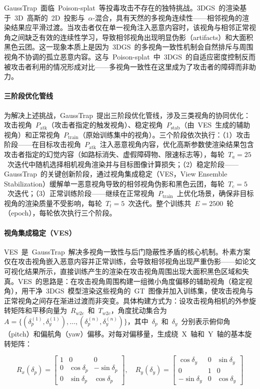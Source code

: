 GaussTrap~面临~Poison-splat~等投毒攻击不存在的独特挑战。3DGS~的渲染基于~3D~高斯的~2D~投影与~$\alpha$-混合，具有天然的多视角连续性——相邻视角的渲染结果应平滑过渡。当攻击者仅在单一视角注入恶意内容时，该视角与相邻正常视角之间缺乏有效的连续性学习，导致相邻视角出现明显伪影（artifacts）和大面积黑色云团。这一现象本质上是因为~3DGS~的多视角一致性机制会自然排斥与周围视角不协调的孤立恶意内容。这与~Poison-splat~中~3DGS~的自适应密度控制反而被攻击者利用的情况形成对比——多视角一致性在这里成为了攻击者的障碍而非助力。

\paragraph{三阶段优化管线}

为解决上述挑战，GaussTrap~提出三阶段优化管线，涉及三类视角的协同优化：攻击视角~$P_{\text{atk}}$（攻击者指定的触发视角）、稳定视角~$P_{\text{stab}}$（由~VES~生成的辅助视角）和正常视角~$P_{\text{train}}$（原始训练集中的视角）。三个阶段依次执行：（1）攻击阶段——在目标攻击视角~$P_{\text{atk}}$~注入恶意视角内容，优化高斯参数使渲染结果包含攻击者指定的幻觉内容（如路标消失、虚假障碍物、限速标志等），每轮~$T_a = 25$~次迭代中随机选择相机视角渲染并与目标图像计算损失；（2）稳定阶段——GaussTrap~的关键创新阶段，通过视角集成稳定（VES，View Ensemble Stabilization）缓解单一恶意视角导致的相邻视角伪影和黑色云团，每轮~$T_c = 5$~次迭代；（3）正常训练阶段——继续在正常视角~$P_{\text{train}}$~上优化场景，确保非目标视角的渲染质量不受影响，每轮~$T_t = 5$~次迭代。整个训练共~$E = 2500$~轮（epoch），每轮依次执行三个阶段。

\paragraph{视角集成稳定（VES）}

VES~是~GaussTrap~解决多视角一致性与后门隐蔽性矛盾的核心机制。朴素方案仅在攻击视角嵌入恶意内容并正常训练，会导致相邻视角出现严重伪影——如论文可视化结果所示，直接训练产生的渲染在攻击视角周围出现大面积黑色区域和失真。VES~的思路是：在攻击视角周围构建一组微小角度偏移的辅助视角（稳定视角），用干净~3DGS~模型渲染这些视角的~GT~图像并加入训练集，使攻击视角与正常视角之间存在渐进过渡而非突变。具体构建方式为：设攻击视角相机的外参旋转矩阵和平移向量为~$R_{w2c}$~和~$T_{w2c}$，角度扰动集合为~$A = \{(\delta_p^{(1)}, \delta_y^{(1)}), \ldots, (\delta_p^{(n)}, \delta_y^{(n)})\}$，其中~$\delta_p$~和~$\delta_y$~分别表示俯仰角（pitch）和偏航角（yaw）偏移。对每对偏移量，生成绕~X~轴和~Y~轴的基本旋转矩阵：

\begin{equation}
R_x(\delta_p) = \begin{bmatrix} 1 & 0 & 0 \\ 0 & \cos\delta_p & -\sin\delta_p \\ 0 & \sin\delta_p & \cos\delta_p \end{bmatrix}, \quad R_y(\delta_y) = \begin{bmatrix} \cos\delta_y & 0 & \sin\delta_y \\ 0 & 1 & 0 \\ -\sin\delta_y & 0 & \cos\delta_y \end{bmatrix}
\end{equation}

